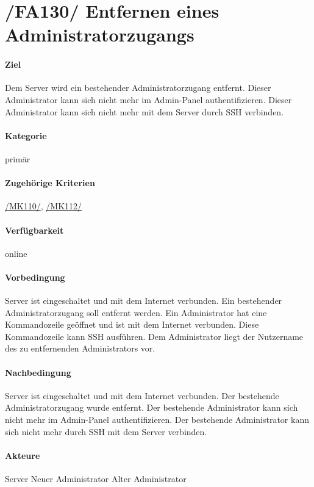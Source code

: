 \section[Entfernen eines Administratorzugangs]{/FA130/ Entfernen eines Administratorzugangs}
\label{/FA140/}
\paragraph{Ziel}
Dem \Gls{Server} wird ein bestehender \Gls{Administrator}zugang entfernt.
Dieser Administrator kann sich nicht mehr im \Gls{Admin-Panel} authentifizieren.
Dieser Administrator kann sich nicht mehr mit dem \Gls{Server} durch \Gls{SSH} verbinden.
\paragraph{Kategorie}
primär
\paragraph{Zugehörige Kriterien}
\hyperref[/MK110/]{/MK110/}, \hyperref[/MK112/]{/MK112/}
\paragraph{Verfügbarkeit}
online
\paragraph{Vorbedingung}
\Gls{Server} ist eingeschaltet und mit dem Internet verbunden.
Ein bestehender \Gls{Administrator}zugang soll entfernt werden.
Ein \Gls{Administrator} hat eine \Gls{Kommandozeile} geöffnet und ist mit dem Internet verbunden.
Diese \Gls{Kommandozeile} kann \Gls{SSH} ausführen.
Dem \Gls{Administrator} liegt der Nutzername des zu entfernenden \Gls{Administrator}s vor.
\paragraph{Nachbedingung}
\Gls{Server} ist eingeschaltet und mit dem Internet verbunden.
Der bestehende \Gls{Administrator}zugang wurde entfernt.
Der bestehende \Gls{Administrator} kann sich nicht mehr im \Gls{Admin-Panel} authentifizieren.
Der bestehende \Gls{Administrator} kann sich nicht mehr durch \Gls{SSH} mit dem Server verbinden.
\paragraph{Akteure}
\Gls{Server}
Neuer \Gls{Administrator}
Alter \Gls{Administrator}
